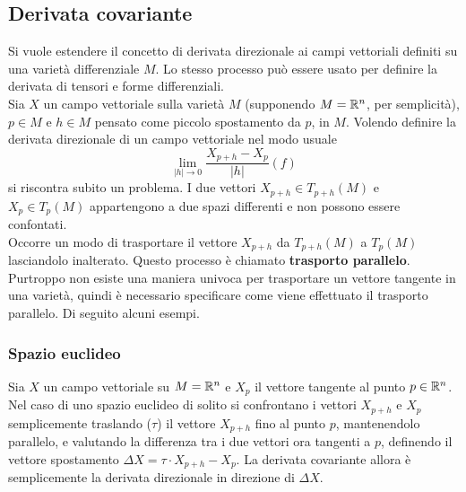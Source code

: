 %

\subsection{Derivata covariante}\label{sec:covariantderivative}
Si vuole estendere il concetto di derivata direzionale ai campi vettoriali definiti
su una varietà differenziale $M$. Lo stesso processo può essere usato per definire
la derivata di tensori e forme differenziali.\\

Sia $X$ un campo vettoriale sulla varietà $M$ (supponendo $M = \mathbb{R}^n$,
per semplicità), $p \in M$ e $h \in M$ pensato come piccolo spostamento da $p$, in $M$.
Volendo definire la derivata direzionale di un campo vettoriale nel modo usuale
$$
   \lim_{|h| \to 0} \frac{X_{p+h}-X_p}{|h|}(f)
$$
si riscontra subito un problema. I due vettori $X_{p+h} \in T_{p+h}(M)$ e
$X_p \in T_p(M)$ appartengono a due spazi differenti e non possono essere confontati.\\
Occorre un modo di trasportare il vettore $X_{p+h}$ da $T_{p+h}(M)$ a $T_p(M)$
lasciandolo inalterato. Questo processo è chiamato \textbf{trasporto parallelo}.
Purtroppo non esiste una maniera univoca per trasportare un vettore tangente in
una varietà, quindi è necessario specificare come viene effettuato il trasporto
parallelo. Di seguito alcuni esempi.

\subsubsection{Spazio euclideo}
Sia $X$ un campo vettoriale su $M = \mathbb{R}^n$ e $X_p$ il vettore tangente al punto $p \in \mathbb{R} ^n$.
Nel caso di uno spazio euclideo di solito si confrontano i vettori
$X_{p+h}$ e $X_p$ semplicemente traslando ($\tau$) il vettore $X_{p+h}$ fino al punto $p$,
mantenendolo parallelo, e valutando la differenza tra i due vettori ora tangenti
a $p$, definendo il vettore spostamento $\Delta X = \tau \cdot X_{p+h} - X_p$.
La derivata covariante allora è semplicemente la derivata direzionale in
direzione di $\Delta X$.

